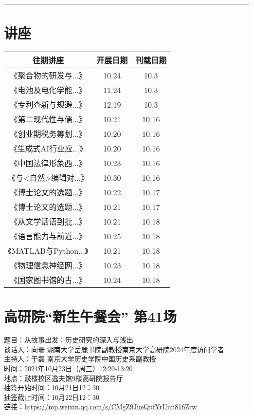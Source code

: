 \documentclass[letterpaper, 12pt]{article}
\begin{document}
\hrule
\pagebreak
\begin{multicols}{2}

\section{讲座}
\begin{tabular}{|c|c|c|}
    \hline
    往期讲座 & 开展日期 & 刊载日期\\
    \hline\hline
    《聚合物的研发与...》 & 10.24 & 10.3\\
    《电池及电化学能...》 & 11.24 & 10.3\\
    《专利查新与规避...》 & 12.19 & 10.3\\
    《第二现代性与儒...》& 10.21 &10.16\\
    《创业期税务筹划...》 & 10.20 & 10.16\\
    《生成式AI行业应...》 & 10.20 & 10.16\\
    《中国法律形象西...》 & 10.23 & 10.16\\
    《与<自然>编辑对...》 & 10.30 & 10.16\\
    《博士论文的选题...》 & 10.22 & 10.17\\
    《博士论文的选题...》 & 10.21 & 10.17\\
    《从文学话语到批...》 & 10.21 & 10.18\\
    《语言能力与前近...》 & 10.25 & 10.18\\
    《MATLAB与Python...》 & 10.21 & 10.18\\
    《物理信息神经网...》 & 10.23 & 10.18\\
    《国家图书馆的古...》 & 10.24 & 10.18\\
    \hline
\end{tabular}
\section{高研院“新生午餐会” 第41场}
题目：从故事出发：历史研究的深入与浅出\\
谈话人：向珊 湖南大学岳麓书院副教授南京大学高研院2024年度访问学者\\
主持人：于磊 南京大学历史学院中国历史系副教授\\
时间：2024年10月23日（周三）12:20-13:20\\
地点：鼓楼校区逸夫馆9楼高研院报告厅\\
抽签开始时间：10月21日12：30\\
抽签截止时间：10月22日12：30\\
链接：\url{https://mp.weixin.qq.com/s/CMgZ9JueQufYrUun816Zrw}\\


\end{multicols}
\end{document}
